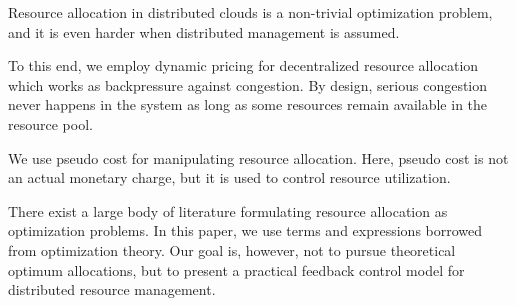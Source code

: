 Resource allocation in distributed clouds is a non-trivial
optimization problem, and it is even harder when distributed
management is assumed.

To this end, we employ dynamic pricing for decentralized resource
allocation which works as backpressure against congestion.
By design, serious congestion never happens in the system as long as
some resources remain available in the resource pool.

We use pseudo cost for manipulating resource allocation.
Here, pseudo cost is not an actual monetary charge, but it is used to
control resource utilization.

There exist a large body of literature formulating resource allocation
as optimization problems.
In this paper, we use terms and expressions borrowed from optimization
theory. Our goal is, however, not to pursue theoretical optimum
allocations, but to present a practical feedback control model for
distributed resource management.


